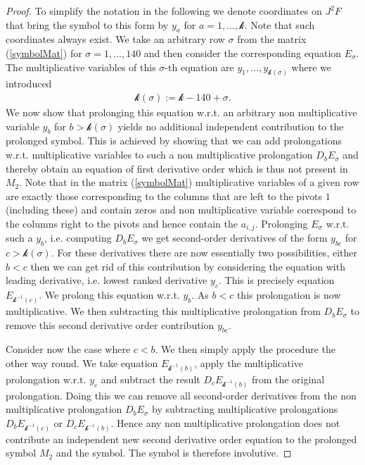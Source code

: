 \documentclass[a4paper,12pt, DIV=14, BCOR=5mm, twoside, headsepline, numbers=noenddot]{scrbook}
\begin{document}
\begin{proof}
To simplify the notation in the following we denote coordinates on $J^2F$ that bring the symbol to this form by $y_a$ for $a = 1,...,\mathcal{k}$. Note that such coordinates always exist. We take an arbitrary row $\sigma$ from the matrix (\ref{symbolMat}) for $\sigma=1,...,140$ and then consider the corresponding equation $E_{\sigma}$. The multiplicative variables of this $\sigma$-th equation are $y_1,...,y_{\mathcal{k}(\sigma)}$ where we introduced 
\begin{align}
\mathcal{k}(\sigma):= \mathcal{k} -140 + \sigma.
\end{align}
We now show that prolonging this equation w.r.t. an arbitrary non multiplicative variable $y_b$ for $b>\mathcal{k}(\sigma)$ yields no additional independent contribution to the prolonged symbol. This is achieved by showing that we can add prolongations w.r.t. multiplicative variables to such a non multiplicative prolongation $D_bE_{\sigma}$ and thereby obtain an equation of first derivative order which is thus not present in $M_2$. Note that in the matrix (\ref{symbolMat}) multiplicative variables of a given row are exactly those corresponding to the columns that are left to the pivots $1$ (including these) and contain zeros and non multiplicative variable correspond to the columns right to the pivots and hence contain the $a_{i,j}$. Prolonging $E_{\sigma}$ w.r.t. such a $y_b$, i.e. computing $D_bE_{\sigma}$ we get second-order derivatives of the form $y_{bc}$ for $c > \mathcal{k}(\sigma) $. For these derivatives there are now essentially two possibilities, either $b<c$ then we can get rid of this contribution by considering the equation with leading derivative, i.e. lowest ranked derivative $y_c$. This is precisely equation $E_{\mathcal{k}^{-1}(c)}$. We prolong this equation w.r.t. $y_b$. As $b<c$ this prolongation is now multiplicative. We then subtracting this multiplicative prolongation from $D_bE_{\sigma}$ to remove this second derivative order contribution $y_{bc}$.

Consider now the case where $c<b$. We then simply apply the procedure the other way round. We take equation $E_{\mathcal{k}^{-1}(b)}$, apply the multiplicative prolongation w.r.t. $y_c$ and subtract the result $D_cE_{\mathcal{k}^{-1}(b)}$ from the original prolongation. Doing this we can remove all second-order derivatives from the non multiplicative prolongation $D_bE_{\sigma}$ by subtracting  multiplicative prolongations $D_bE_{\mathcal{k}^{-1}(c)}$ or $D_cE_{\mathcal{k}^{-1}(b)}$. Hence any non multiplicative prolongation does not contribute an independent new second derivative order equation to the prolonged symbol $M_2$ and the symbol. The symbol is therefore involutive. 


\end{proof}
\end{document}
